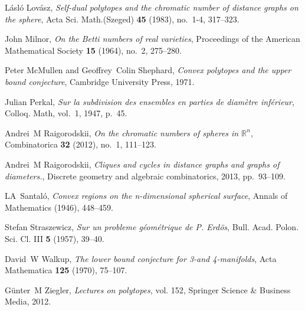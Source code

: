 \documentclass[12pt]{amsart}
\theoremstyle{plain}
\numberwithin{equation}{section}
\begin{document}
\begin{thebibliography}{Kat89}
	L{\'a}sl{\'o} Lov{\'a}sz, \emph{Self-dual polytopes and the chromatic number of
	  distance graphs on the sphere}, Acta Sci. Math.(Szeged) \textbf{45} (1983),
	  no.~1-4, 317--323.

	John Milnor, \emph{On the Betti numbers of real varieties}, Proceedings of the
	  American Mathematical Society \textbf{15} (1964), no.~2, 275--280.
	
	Peter McMullen and Geoffrey~Colin Shephard, \emph{Convex polytopes and the
	  upper bound conjecture}, Cambridge University Press, 1971.
	
	Julian Perkal, \emph{Sur la subdivision des ensembles en parties de
	  diam{\`e}tre inf{\'e}rieur}, Colloq. Math, vol.~1, 1947, p.~45.
	
Andrei~M Raigorodskii, \emph{On the chromatic numbers of spheres in
  $\mathbb{R}^n$}, Combinatorica \textbf{32} (2012), no.~1, 111--123.
  
	Andrei~M Raigorodskii, \emph{Cliques and cycles in distance graphs and graphs
	  of diameters.}, Discrete geometry and algebraic combinatorics, 2013,
	  pp.~93--109.

LA~Santal{\'o}, \emph{Convex regions on the n-dimensional spherical surface},
  Annals of Mathematics (1946), 448--459.

	Stefan Straszewicz, \emph{Sur un probleme g{\'e}om{\'e}trique de {P}. {E}rd{\"{o}}s},
	  Bull. Acad. Polon. Sci. Cl. III \textbf{5} (1957), 39--40.

	David~W Walkup, \emph{The lower bound conjecture for 3-and 4-manifolds}, Acta
	  Mathematica \textbf{125} (1970), 75--107.

	G{\"u}nter~M Ziegler, \emph{Lectures on polytopes}, vol. 152, Springer Science
	\& Business Media, 2012.
\end{thebibliography}
\end{document}
